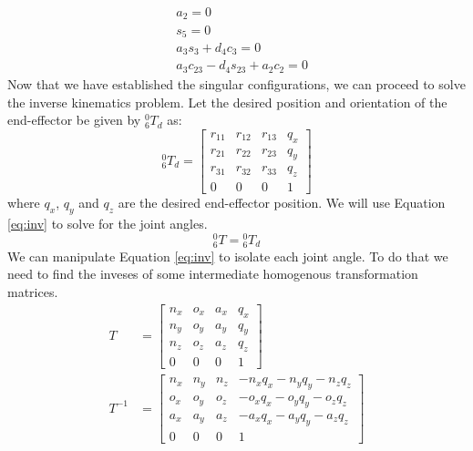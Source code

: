 \begin{equation} \label{eq:singular_config}
    \begin{aligned}
         & a_2 = 0                            \\
         & s_5 = 0                            \\
         & a_3s_3 + d_4c_3 = 0                \\
         & a_3c_{23} - d_4s_{23} + a_2c_2 = 0
    \end{aligned}
\end{equation}
Now that we have established the singular configurations, we can proceed to solve the inverse kinematics problem.
Let the desired position and orientation of the end-effector be given by ${_6^{0}}T_d$ as:
\begin{equation} \label{eq:Td}
    {_6^{0}}T_d=\begin{bmatrix}
        r_{11} & r_{12} & r_{13} & q_x \\
        r_{21} & r_{22} & r_{23} & q_y \\
        r_{31} & r_{32} & r_{33} & q_z \\
        0      & 0      & 0      & 1
    \end{bmatrix}
\end{equation}
where $q_x$, $q_y$ and $q_z$ are the desired end-effector position. We will use Equation \ref{eq:inv}
to solve for the joint angles.
\begin{equation} \label{eq:inv}
    {_6^{0}}T={_6^{0}}T_d
\end{equation}
We can manipulate Equation \ref{eq:inv} to isolate each joint angle. To do that we need to find the inveses of some intermediate homogenous transformation matrices.
\begin{equation} \label{eq:TTinv}
    \begin{aligned}
        T      & =\begin{bmatrix}
                      n_x & o_x & a_x & q_x \\
                      n_y & o_y & a_y & q_y \\
                      n_z & o_z & a_z & q_z \\
                      0   & 0   & 0   & 1
                  \end{bmatrix}                   \\
        T^{-1} & =\begin{bmatrix}
                      n_x & n_y & n_z & -n_xq_x-n_yq_y-n_zq_z \\
                      o_x & o_y & o_z & -o_xq_x-o_yq_y-o_zq_z \\
                      a_x & a_y & a_z & -a_xq_x-a_yq_y-a_zq_z \\
                      0   & 0   & 0   & 1
                  \end{bmatrix}
    \end{aligned}
\end{equation}

